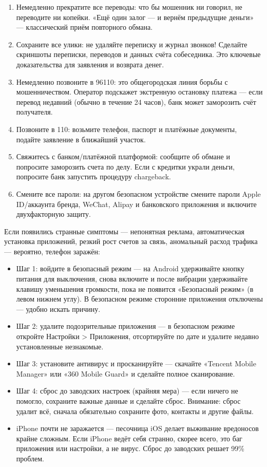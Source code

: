 \begin{enumerate}
  \item Немедленно прекратите все переводы: что бы мошенник ни говорил, не переводите ни копейки. «Ещё один залог — и вернём предыдущие деньги» — классический приём повторного обмана.
  \item Сохраните все улики: не удаляйте переписку и журнал звонков! Сделайте скриншоты переписки, переводов и данных счёта собеседника. Это ключевые доказательства для заявления и возврата денег.
  \item Немедленно позвоните в 96110: это общегородская линия борьбы с мошенничеством. Оператор подскажет экстренную остановку платежа — если перевод недавний (обычно в течение 24 часов), банк может заморозить счёт получателя.
  \item Позвоните в 110: возьмите телефон, паспорт и платёжные документы, подайте заявление в ближайший участок.
  \item Свяжитесь с банком/платёжной платформой: сообщите об обмане и попросите заморозить счета по делу. Если с кредитки украли деньги, попросите банк запустить процедуру chargeback.
  \item Смените все пароли: на другом безопасном устройстве смените пароли Apple ID/аккаунта бренда, WeChat, Alipay и банковского приложения и включите двухфакторную защиту.
\end{enumerate}


Если появились странные симптомы — непонятная реклама, автоматическая установка приложений, резкий рост счетов за связь, аномальный расход трафика — вероятно, телефон заражён:

\begin{itemize}
  \item Шаг 1: войдите в безопасный режим — на Android удерживайте кнопку питания для выключения, снова включите и после вибрации удерживайте клавишу уменьшения громкости, пока не появится «Безопасный режим» (в левом нижнем углу). В безопасном режиме сторонние приложения отключены — удобно искать причину.
  \item Шаг 2: удалите подозрительные приложения — в безопасном режиме откройте Настройки > Приложения, отсортируйте по дате и удалите недавно установленные незнакомые.
  \item Шаг 3: установите антивирус и просканируйте — скачайте «Tencent Mobile Manager» или «360 Mobile Guard» и сделайте полное сканирование.
  \item Шаг 4: сброс до заводских настроек (крайняя мера) — если ничего не помогло, сохраните важные данные и сделайте сброс. Внимание: сброс удалит всё, сначала обязательно сохраните фото, контакты и другие файлы.
  \item iPhone почти не заражается — песочница iOS делает выживание вредоносов крайне сложным. Если iPhone ведёт себя странно, скорее всего, это баг приложения или настройки, а не вирус. Сброс до заводских решает 99\% проблем.
\end{itemize}

